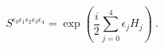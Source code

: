 \begin{equation}
 S^{\epsilon_0 \epsilon_1 \epsilon_2 \epsilon_3 \epsilon_4} 
 = \exp \left(  \frac{i}{2} \sum_{j=0}^{4} \epsilon_j H_j \right) ~.
\label{spin field}
\end{equation}

